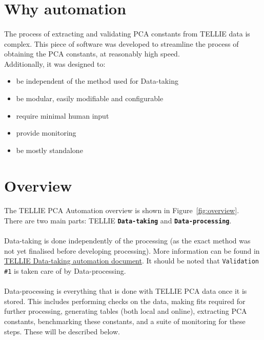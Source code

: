 \documentclass[12pt]{article}
\begin{document}
\section{Why automation}
\paragraph{}
The process of extracting and validating PCA constants from TELLIE data is complex. This piece of software was developed to streamline the process of obtaining the PCA constants, at reasonably high speed. \\
Additionally, it was designed to:
\begin{itemize}
	\item be independent of the method used for Data-taking
	\item be modular, easily modifiable and configurable
	\item require minimal human input
	\item provide monitoring
	\item be mostly standalone
\end{itemize}

\section{Overview}
\paragraph{}
The TELLIE PCA Automation overview is shown in Figure~\ref{fig:overview}.\\There are two main parts: TELLIE \textbf{\texttt{Data-taking}} and \textbf{\texttt{Data-processing}}.

\paragraph{}
Data-taking is done independently of the processing (as the exact method was not yet finalised before developing processing). More information can be found in \href{https://www.snolab.ca/snoplus/private/DocDB/cgi/ShowDocument?docid=7612}{TELLIE Data-taking automation document}. It should be noted that \texttt{Validation \#1} is taken care of by Data-processing.

\paragraph{}
Data-processing is everything that is done with TELLIE PCA data once it is stored. This includes performing checks on the data, making fits required for further processing, generating tables (both local and online), extracting PCA constants, benchmarking these constants, and a suite of monitoring for these steps. These will be described below.
\end{document}
